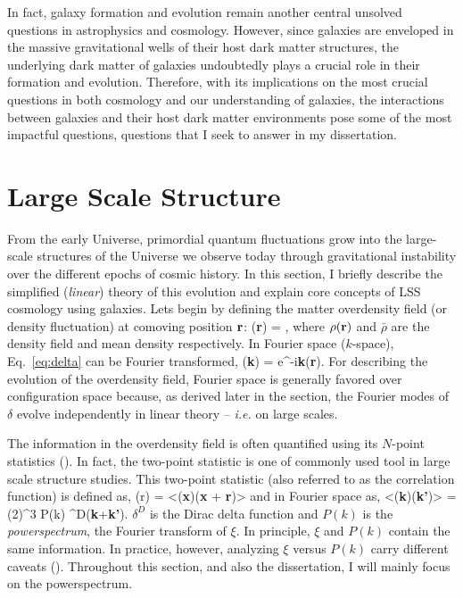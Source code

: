 In fact, galaxy formation and evolution remain another central unsolved questions in
astrophysics and cosmology. However, since galaxies are enveloped in the massive gravitational
wells of their host dark matter structures, the underlying dark matter of galaxies undoubtedly
plays a crucial role in their formation and evolution. Therefore, with its implications on the most
crucial questions in both cosmology and our understanding of galaxies, the interactions between
galaxies and their host dark matter environments pose some of the most impactful questions,
questions that I seek to answer in my dissertation. 


\section{Large Scale Structure} \label{sec:lss}
From the early Universe, primordial quantum fluctuations grow into the 
large-scale structures of the Universe we observe today through gravitational 
instability over the different epochs of cosmic history. In this section, I briefly 
describe the simplified ({\em linear}) theory of this evolution and explain core 
concepts of LSS cosmology using galaxies. Lets begin by defining the matter 
overdensity field (or density fluctuation) at comoving position ${\bf r}$: 
\beq \label{eq:delta}
\delta({\bf r}) = , 
\eeq
where $\rho({\bf r})$ and $\bar{\rho}$ are the density field and mean 
density respectively. In Fourier space ($k$-space), Eq.~\ref{eq:delta} can 
be Fourier transformed, 
\beq
\delta({\bf k}) = \int {} e^{-i{\bf k}}\;\delta({\bf r}).
\eeq
For describing the evolution of the overdensity field, Fourier space is generally 
favored over configuration space because, as derived later in the section,
the Fourier modes of $\delta$ evolve independently in linear theory -- 
\emph{i.e.} on large scales.

The information in the overdensity field is often quantified using its 
$N$-point statistics (). In fact, the two-point
statistic is one of commonly used tool in large scale structure studies.
This two-point statistic (also referred to as the correlation function) is
defined as, 
\beq
\xi(r) = <\delta({\bf x})\delta({\bf x} +  {\bf r})>
\eeq
and in Fourier space as,
\beq
<\delta({\bf k})\delta({\bf k'})> = (2\pi)^3 P(k) \delta^{D}({\bf k}+{\bf k'}).
\eeq
$\delta^{D}$ is the Dirac delta function and $P(k)$ is the {\em powerspectrum}, 
the Fourier transform of $\xi$. In principle, $\xi$ and $P(k)$ contain the same 
information. In practice, however, analyzing $\xi$ versus $P(k)$ carry different 
caveats (). Throughout this section, and also the dissertation, 
I will mainly focus on the powerspectrum. 

